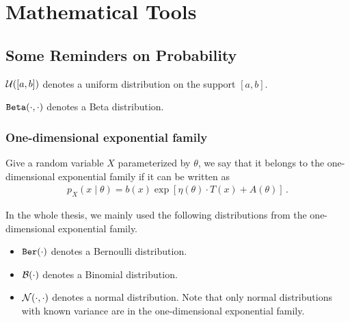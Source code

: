 \chapter{Mathematical Tools}\label{CHAP:MATHS}


\section{Some Reminders on Probability}\label{app:maths.proba}

$\mathcal{U}([a,b])$ denotes a uniform distribution on the support $[a,b]$.

$\texttt{Beta}(\cdot,\cdot)$ denotes a Beta distribution.

\subsection{One-dimensional exponential family}\label{app:maths.proba.exponential}

\begin{definition}\label{def:maths.exponential}
\begin{leftbar}[defnbar]
    Give a random variable $X$ parameterized by $\theta$, we say that it belongs to the one-dimensional exponential family if it can be written as
\begin{align}
    p_{X}(x \mid \theta ) = b(x) \exp \left[\eta (\theta ) \cdot T(x) + A(\theta )\right]\,.
\end{align}
\end{leftbar}
\end{definition}

In the whole thesis, we mainly used the following distributions from the one-dimensional exponential family.

\begin{itemize}
    \item $\texttt{Ber}(\cdot)$ denotes a Bernoulli distribution.
    \item $\mathcal{B}(\cdot)$ denotes a Binomial distribution.
    \item $\mathcal{N}(\cdot,\cdot)$ denotes a normal distribution. Note that only normal distributions with known variance are in the one-dimensional exponential family.
\end{itemize}

